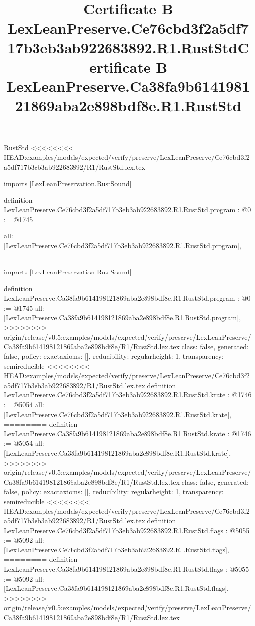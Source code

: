 \begin{lexlean}{RustStd}
<<<<<<<< HEAD:examples/models/expected/verify/preserve/LexLeanPreserve/Ce76cbd3f2a5df717b3eb3ab922683892/R1/RustStd.lex.tex
\title{Certificate B LexLeanPreserve.Ce76cbd3f2a5df717b3eb3ab922683892.R1.RustStd}
\begin{coremodule}
imports [LexLeanPreservation.RustSound]

definition LexLeanPreserve.Ce76cbd3f2a5df717b3eb3ab922683892.R1.RustStd.program : @0 := @1745 {
  all: [LexLeanPreserve.Ce76cbd3f2a5df717b3eb3ab922683892.R1.RustStd.program],
========
\title{Certificate B LexLeanPreserve.Ca38fa9b614198121869aba2e898bdf8e.R1.RustStd}
\begin{coremodule}
imports [LexLeanPreservation.RustSound]

definition LexLeanPreserve.Ca38fa9b614198121869aba2e898bdf8e.R1.RustStd.program : @0 := @1745 {
  all: [LexLeanPreserve.Ca38fa9b614198121869aba2e898bdf8e.R1.RustStd.program],
>>>>>>>> origin/release/v0.5:examples/models/expected/verify/preserve/LexLeanPreserve/Ca38fa9b614198121869aba2e898bdf8e/R1/RustStd.lex.tex
  class: false,
  generated: false,
  policy: exact{axioms: []},
  reducibility: regular{height: 1},
  transparency: semireducible
}
<<<<<<<< HEAD:examples/models/expected/verify/preserve/LexLeanPreserve/Ce76cbd3f2a5df717b3eb3ab922683892/R1/RustStd.lex.tex
definition LexLeanPreserve.Ce76cbd3f2a5df717b3eb3ab922683892.R1.RustStd.krate : @1746 := @5054 {
  all: [LexLeanPreserve.Ce76cbd3f2a5df717b3eb3ab922683892.R1.RustStd.krate],
========
definition LexLeanPreserve.Ca38fa9b614198121869aba2e898bdf8e.R1.RustStd.krate : @1746 := @5054 {
  all: [LexLeanPreserve.Ca38fa9b614198121869aba2e898bdf8e.R1.RustStd.krate],
>>>>>>>> origin/release/v0.5:examples/models/expected/verify/preserve/LexLeanPreserve/Ca38fa9b614198121869aba2e898bdf8e/R1/RustStd.lex.tex
  class: false,
  generated: false,
  policy: exact{axioms: []},
  reducibility: regular{height: 1},
  transparency: semireducible
}
<<<<<<<< HEAD:examples/models/expected/verify/preserve/LexLeanPreserve/Ce76cbd3f2a5df717b3eb3ab922683892/R1/RustStd.lex.tex
definition LexLeanPreserve.Ce76cbd3f2a5df717b3eb3ab922683892.R1.RustStd.flags : @5055 := @5092 {
  all: [LexLeanPreserve.Ce76cbd3f2a5df717b3eb3ab922683892.R1.RustStd.flags],
========
definition LexLeanPreserve.Ca38fa9b614198121869aba2e898bdf8e.R1.RustStd.flags : @5055 := @5092 {
  all: [LexLeanPreserve.Ca38fa9b614198121869aba2e898bdf8e.R1.RustStd.flags],
>>>>>>>> origin/release/v0.5:examples/models/expected/verify/preserve/LexLeanPreserve/Ca38fa9b614198121869aba2e898bdf8e/R1/RustStd.lex.tex
}}}
\end{coremodule}}
\end{coremodule}
\end{lexlean}
